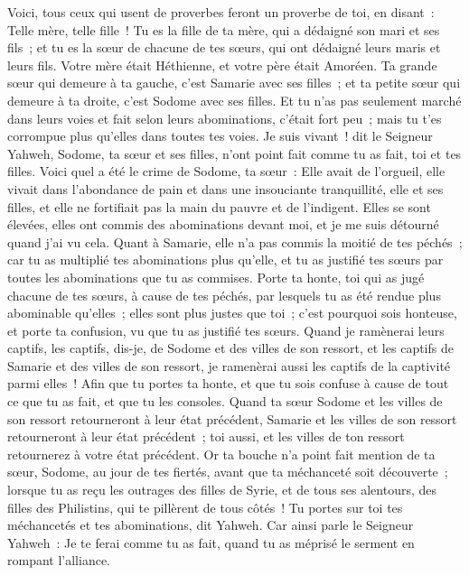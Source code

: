 \begin{multicols}{2}
Voici, tous ceux qui usent de proverbes feront un proverbe de toi, en disant~: Telle mère, telle fille~!
Tu es la fille de ta mère, qui a dédaigné son mari et ses fils~; et tu es la sœur de chacune de tes sœurs, qui ont dédaigné leurs maris et leurs fils. Votre mère était Héthienne, et votre père était Amoréen.
Ta grande sœur qui demeure à ta gauche, c'est Samarie avec ses filles~; et ta petite sœur qui demeure à ta droite, c'est Sodome avec ses filles.
Et tu n'as pas seulement marché dans leurs voies et fait selon leurs abominations, c'était fort peu~; mais tu t'es corrompue plus qu'elles dans toutes tes voies.
Je suis vivant~! dit le Seigneur Yahweh, Sodome, ta sœur et ses filles, n'ont point fait comme tu as fait, toi et tes filles.
Voici quel a été le crime de Sodome, ta sœur~: Elle avait de l'orgueil, elle vivait dans l'abondance de pain et dans une insouciante tranquillité, elle et ses filles, et elle ne fortifiait pas la main du pauvre et de l'indigent.
Elles se sont élevées, elles ont commis des abominations devant moi, et je me suis détourné quand j'ai vu cela.
Quant à Samarie, elle n'a pas commis la moitié de tes péchés~; car tu as multiplié tes abominations plus qu'elle, et tu as justifié tes sœurs par toutes les abominations que tu as commises.
Porte ta honte, toi qui as jugé chacune de tes sœurs, à cause de tes péchés, par lesquels tu as été rendue plus abominable qu'elles~; elles sont plus justes que toi~; c'est pourquoi sois honteuse, et porte ta confusion, vu que tu as justifié tes sœurs.
Quand je ramènerai leurs captifs, les captifs, dis-je, de Sodome et des villes de son ressort, et les captifs de Samarie et des villes de son ressort, je ramenèrai aussi les captifs de la captivité parmi elles~!
Afin que tu portes ta honte, et que tu sois confuse à cause de tout ce que tu as fait, et que tu les consoles.
Quand ta sœur Sodome et les villes de son ressort retourneront à leur état précédent, Samarie et les villes de son ressort retourneront à leur état précédent~; toi aussi, et les villes de ton ressort retournerez à votre état précédent.
Or ta bouche n'a point fait mention de ta sœur, Sodome, au jour de tes fiertés,
avant que ta méchanceté soit découverte~; lorsque tu as reçu les outrages des filles de Syrie, et de tous ses alentours, des filles des Philistins, qui te pillèrent de tous côtés~!
Tu portes sur toi tes méchancetés et tes abominations, dit Yahweh.
Car ainsi parle le Seigneur Yahweh~: Je te ferai comme tu as fait, quand tu as méprisé le serment en rompant l'alliance.

\end{multicols}
